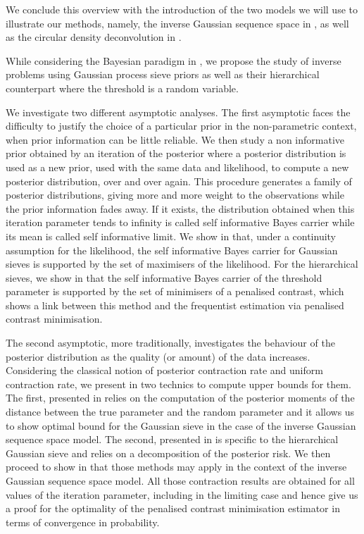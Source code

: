 \documentclass[a4paper,11pt]{book}
\begin{document}
We conclude this overview with the introduction of the two models we will use to illustrate our methods, namely, the inverse Gaussian sequence space in , as well as the circular density deconvolution in . 

\medskip

While considering the Bayesian paradigm in , we propose the study of inverse problems using Gaussian process sieve priors as well as their hierarchical counterpart where the threshold is a random variable.

We investigate two different asymptotic analyses.
The first asymptotic faces the difficulty to justify the choice of a particular prior in the non-parametric context, when prior information can be little reliable.
We then study a non informative prior obtained by an iteration of the posterior where a posterior distribution is used as a new prior, used with the same data and likelihood, to compute a new posterior distribution, over and over again.
This procedure generates a family of posterior distributions, giving more and more weight to the observations while the prior information fades away.
If it exists, the distribution obtained when this iteration parameter tends to infinity is called self informative Bayes carrier while its mean is called self informative limit.
We show in  that, under a continuity assumption for the likelihood, the self informative Bayes carrier for Gaussian sieves is supported by the set of maximisers of the likelihood.
For the hierarchical sieves, we show in  that the self informative Bayes carrier of the threshold parameter is supported by the set of minimisers of a penalised contrast, which shows a link between this method and the frequentist estimation via penalised contrast minimisation.

The second asymptotic, more traditionally, investigates the behaviour of the posterior distribution as the quality (or amount) of the data increases.
Considering the classical notion of posterior contraction rate and uniform contraction rate, we present in  two technics to compute upper bounds for them.
The first, presented in  relies on the computation of the posterior moments of the distance between the true parameter and the random parameter and it allows us to show optimal bound for the Gaussian sieve in the case of the inverse Gaussian sequence space model.
The second, presented in  is specific to the hierarchical Gaussian sieve and relies on a decomposition of the posterior risk.
We then proceed to show in  that those methods may apply in the context of the inverse Gaussian sequence space model.
All those contraction results are obtained for all values of the iteration parameter, including in the limiting case and hence give us a proof for the optimality of the penalised contrast minimisation estimator in terms of convergence in probability.
\end{document}
